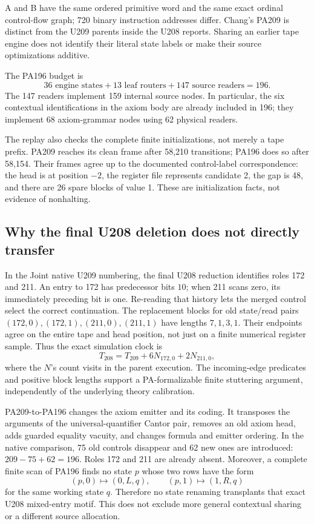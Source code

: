 A and B have the same ordered primitive word and the same exact ordinal
control-flow graph; 720 binary instruction addresses differ. Chang's
PA209 is distinct from the U209 parents inside the U208 reports. Sharing
an earlier tape engine does not identify their literal state labels or
make their source optimizations additive.

The PA196 budget is
\[
36\text{ engine states}+13\text{ leaf routers}
 +147\text{ source readers}=196.
\]
The 147 readers implement 159 internal source nodes. In particular, the
six contextual identifications in the axiom body are already included
in 196; they implement 68 axiom-grammar nodes using 62 physical readers.

The replay also checks the complete finite initializations, not merely
a tape prefix. PA209 reaches its clean frame after 58,210 transitions;
PA196 does so after 58,154. Their frames agree up to the documented
control-label correspondence: the head is at position $-2$, the register
file represents candidate 2, the gap is 48, and there are 26 spare blocks
of value 1. These are initialization facts, not evidence of nonhalting.

\subsection{Why the final U208 deletion does not directly transfer}

In the Joint native U209 numbering, the final U208 reduction identifies
roles 172 and 211. An entry to 172 has predecessor bits $10$; when 211
scans zero, its immediately preceding bit is one. Re-reading that history
lets the merged control select the correct continuation. The replacement
blocks for old state/read pairs
$(172,0),(172,1),(211,0),(211,1)$ have lengths $7,1,3,1$.
Their endpoints agree on the entire tape and head position, not just on a
finite numerical register sample. Thus the exact simulation clock is
\[
 T_{208}=T_{209}+6N_{172,0}+2N_{211,0},
\]
where the $N$'s count visits in the parent execution. The incoming-edge
predicates and positive block lengths support a PA-formalizable finite
stuttering argument, independently of the underlying theory calibration.

PA209-to-PA196 changes the axiom emitter and its coding. It transposes the
arguments of the universal-quantifier Cantor pair, removes an old axiom
head, adds guarded equality vacuity, and changes formula and emitter
ordering. In the native comparison, 75 old controls disappear and 62 new
ones are introduced: $209-75+62=196$. Roles 172 and 211 are already absent.
Moreover, a complete finite scan of PA196 finds no state $p$ whose two
rows have the form
\[
(p,0)\mapsto(0,L,q),\qquad(p,1)\mapsto(1,R,q)
\]
for the same working state $q$. Therefore no state renaming transplants
that exact U208 mixed-entry motif. This does not exclude more general
contextual sharing or a different source allocation.

